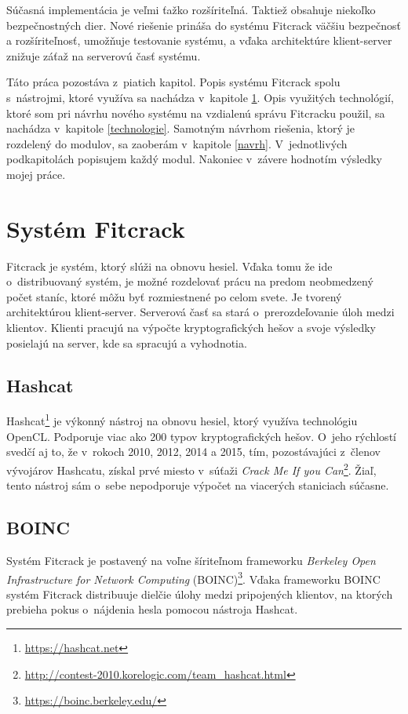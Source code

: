 \documentclass[slovak,cprint]{fitthesis} %
\begin{document}
Súčasná implementácia je veľmi ťažko rozšíriteľná. Taktiež obsahuje niekoľko bezpečnostných dier. Nové riešenie prináša do systému Fitcrack väčšiu bezpečnosť a rozšíriteľnosť, umožňuje testovanie systému, a vďaka architektúre klient-server znižuje záťaž na serverovú časť systému.

Táto práca pozostáva z~piatich kapitol. Popis systému Fitcrack spolu s~nástrojmi, ktoré využíva sa nachádza v~kapitole \ref{Fitcrack}. Opis využitých technológií, ktoré som pri návrhu nového systému na vzdialenú správu Fitcracku použil, sa nachádza v~kapitole \ref{technologie}. Samotným návrhom riešenia, ktorý je rozdelený do modulov, sa zaoberám v~kapitole \ref{navrh}. V~jednotlivých podkapitolách popisujem každý modul. Nakoniec v~závere hodnotím výsledky mojej práce. 



\chapter{Systém Fitcrack}\label{Fitcrack}
Fitcrack je systém, ktorý slúži na obnovu hesiel. Vďaka tomu že ide o~distribuovaný systém, je možné rozdelovať prácu na predom neobmedzený počet staníc, ktoré môžu byť rozmiestnené po celom svete. Je tvorený  architektúrou klient-server. Serverová časť sa stará o~prerozdeľovanie úloh medzi klientov. Klienti pracujú na výpočte kryptografických hešov a svoje výsledky posielajú na server, kde sa spracujú a vyhodnotia.
\cite{fitcrackSprava}


\label{hashcat}
\section{Hashcat}
Hashcat\footnote{\url{https://hashcat.net}} je výkonný nástroj na obnovu hesiel, ktorý využíva technológiu OpenCL. Podporuje viac ako 200 typov kryptografických hešov. O~jeho rýchlostí svedčí aj to, že v~rokoch 2010, 2012, 2014 a 2015, tím, pozostávajúci z~členov vývojárov Hashcatu, získal prvé miesto v~súťaži \textit{Crack Me If you Can}\footnote{\url{http://contest-2010.korelogic.com/team_hashcat.html}}. Žiaľ, tento nástroj sám o~sebe nepodporuje výpočet na viacerých staniciach súčasne.


\section{BOINC}
Systém Fitcrack je postavený na voľne šíriteľnom frameworku \textit{Berkeley Open Infrastructure for Network Computing} (BOINC)\footnote{\url{https://boinc.berkeley.edu/}}. Vďaka frameworku BOINC systém Fitcrack distribuuje dielčie úlohy medzi pripojených klientov, na ktorých prebieha pokus o~nájdenia hesla pomocou nástroja Hashcat.
\end{document}
